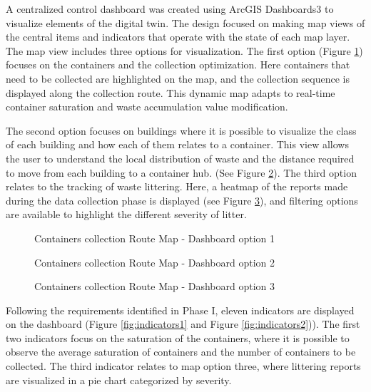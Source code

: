 \documentclass[authoryear,preprint,review,12pt]{elsarticle}
\begin{document}
    A centralized control dashboard was created using ArcGIS Dashboards3 to visualize elements of the digital twin. The design focused on making map views of the central items and indicators that operate with the state of each map layer. The map view includes three options for visualization. The first option (Figure \ref{fig:collection1}) focuses on the containers and the collection optimization. Here containers that need to be collected are highlighted on the map, and the collection sequence is displayed along the collection route. This dynamic map adapts to real-time container saturation and waste accumulation value modification.

    The second option focuses on buildings where it is possible to visualize the class of each building and how each of them relates to a container. This view allows the user to understand the local distribution of waste and the distance required to move from each building to a container hub. (See Figure \ref{fig:collection2}). The third option relates to the tracking of waste littering. Here, a heatmap of the reports made during the data collection phase is displayed (see Figure \ref{fig:collection3}), and filtering options are available to highlight the different severity of litter.

    \begin{figure}
        \caption{Containers collection Route Map - Dashboard option 1}
        \label{fig:collection1}
    \end{figure}

    \begin{figure}
        \caption{Containers collection Route Map - Dashboard option 2}
        \label{fig:collection2}
    \end{figure}


    \begin{figure}
        \caption{Containers collection Route Map - Dashboard option 3}
        \label{fig:collection3}
    \end{figure}

    Following the requirements identified in Phase I, eleven indicators are displayed on the dashboard (Figure \ref{fig:indicators1} and Figure \ref{fig:indicators2})). The first two indicators focus on the saturation of the containers, where it is possible to observe the average saturation of containers and the number of containers to be collected. The third indicator relates to map option three, where littering reports are visualized in a pie chart categorized by severity.
\end{document}

